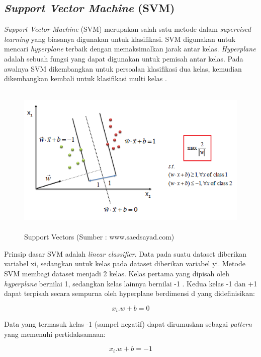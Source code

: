 \subsection{\textit{Support Vector Machine} (SVM)}
\textit{Support Vector Machine} (SVM) merupakan salah satu metode dalam \textit{supervised learning} yang biasanya digunakan untuk klasifikasi. SVM digunakan untuk mencari \textit{hyperplane} terbaik dengan memaksimalkan jarak antar kelas. \textit{Hyperplane} adalah sebuah fungsi yang dapat digunakan untuk pemisah antar kelas. Pada awalnya SVM dikembangkan untuk persoalan klasifikasi dua kelas, kemudian dikembangkan kembali untuk klasifikasi multi kelas \citep{Braun2011}.

\begin{figure}[H]
	\centering
	\includegraphics[width=13cm, height=7.3cm]{gambar/index3_souoaz}
	\caption{Support Vectors (Sumber : www.saedsayad.com)}
	\label{index3_souoaz}
\end{figure}


\par Prinsip dasar SVM adalah \textit{linear classifier}. Data pada suatu dataset diberikan variabel xi, sedangkan untuk kelas pada dataset diberikan variabel yi. Metode SVM membagi dataset menjadi 2 kelas. Kelas pertama yang dipisah oleh \textit{hyperplane} bernilai 1, sedangkan kelas lainnya bernilai -1 \citep{Santos2021}. Kedua kelas -1 dan +1 dapat terpisah secara sempurna oleh hyperplane berdimensi d yang didefinisikan:

\begin{equation}
	x_i.w + b = 0
\end{equation}

Data yang termasuk kelas -1 (sampel negatif) dapat dirumuskan sebagai \textit{pattern} yang memenuhi pertidaksamaan:

\begin{equation}
	x_i.w + b = -1
\end{equation}


